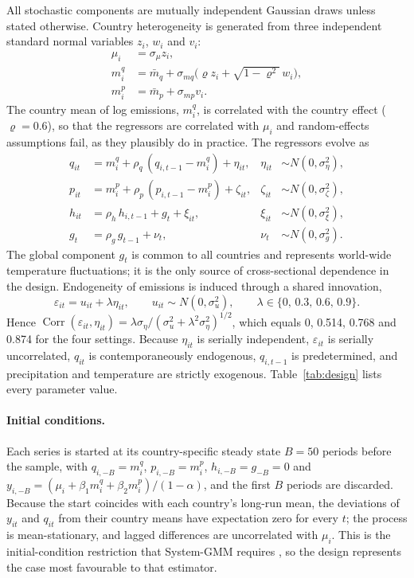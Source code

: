 \documentclass[11pt,a4paper]{article}
\begin{document}
All stochastic components are mutually independent Gaussian draws unless stated otherwise. Country heterogeneity is generated from three independent standard normal variables $z_i$, $w_i$ and $v_i$:
\begin{align}
\mu_i &= \sigma_\mu z_i, \label{eq:mu}\\
m^q_i &= \bar m_q+\sigma_{mq}\big(\varrho z_i+\sqrt{1-\varrho^2}\,w_i\big), \label{eq:mq}\\
m^p_i &= \bar m_p+\sigma_{mp}v_i. \label{eq:mp}
\end{align}
The country mean of log emissions, $m^q_i$, is correlated with the country effect ($\varrho=0.6$), so that the regressors are correlated with $\mu_i$ and random-effects assumptions fail, as they plausibly do in practice. The regressors evolve as
\begin{align}
q_{it} &= m^q_i+\rho_q\,(q_{i,t-1}-m^q_i)+\eta_{it}, & \eta_{it}&\sim N(0,\sigma_\eta^2), \label{eq:q}\\
p_{it} &= m^p_i+\rho_p\,(p_{i,t-1}-m^p_i)+\zeta_{it}, & \zeta_{it}&\sim N(0,\sigma_\zeta^2), \label{eq:p}\\
h_{it} &= \rho_h\,h_{i,t-1}+g_t+\xi_{it}, & \xi_{it}&\sim N(0,\sigma_\xi^2), \label{eq:h}\\
g_t &= \rho_g\,g_{t-1}+\nu_t, & \nu_t&\sim N(0,\sigma_g^2). \label{eq:g}
\end{align}
The global component $g_t$ is common to all countries and represents world-wide temperature fluctuations; it is the only source of cross-sectional dependence in the design. Endogeneity of emissions is induced through a shared innovation,
\begin{equation}\label{eq:endog}
\varepsilon_{it}=u_{it}+\lambda\eta_{it},\qquad u_{it}\sim N(0,\sigma_u^2),\qquad \lambda\in\{0,\,0.3,\,0.6,\,0.9\}.
\end{equation}
Hence $\operatorname{Corr}(\varepsilon_{it},\eta_{it})=\lambda\sigma_\eta/(\sigma_u^2+\lambda^2\sigma_\eta^2)^{1/2}$, which equals 0, 0.514, 0.768 and 0.874 for the four settings. Because $\eta_{it}$ is serially independent, $\varepsilon_{it}$ is serially uncorrelated, $q_{it}$ is contemporaneously endogenous, $q_{i,t-1}$ is predetermined, and precipitation and temperature are strictly exogenous. Table~\ref{tab:design} lists every parameter value.

\paragraph{Initial conditions.} Each series is started at its country-specific steady state $B=50$ periods before the sample, with $q_{i,-B}=m^q_i$, $p_{i,-B}=m^p_i$, $h_{i,-B}=g_{-B}=0$ and $y_{i,-B}=(\mu_i+\beta_1 m^q_i+\beta_2 m^p_i)/(1-\alpha)$, and the first $B$ periods are discarded. Because the start coincides with each country's long-run mean, the deviations of $y_{it}$ and $q_{it}$ from their country means have expectation zero for every $t$; the process is mean-stationary, and lagged differences are uncorrelated with $\mu_i$. This is the initial-condition restriction that System-GMM requires \citep{Blundell1998}, so the design represents the case most favourable to that estimator.
\end{document}
